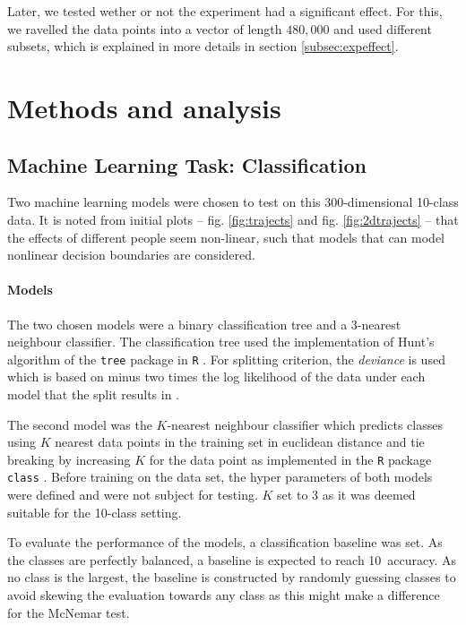 \documentclass[11pt,fleqn]{article}
\begin{document}
Later, we tested wether or not the experiment had a significant effect.
For this, we ravelled the data points into a vector of length $ 480,000 $ and used different subsets, which is explained in more details in section \ref{subsec:expeffect}.


\section{Methods and analysis}


\subsection{Machine Learning Task: Classification}
Two machine learning models were chosen to test on this 300-dimensional 10-class data.
It is noted from initial plots -- fig. \ref{fig:trajects} and fig. \ref{fig:2dtrajects} -- that the effects of different people seem non-linear, such that models that can model nonlinear decision boundaries are considered.


\paragraph{Models} The two chosen models were a binary classification tree and a 3-nearest neighbour classifier. The classification tree used the implementation of Hunt's algorithm of the \texttt{tree} package in \texttt{R} \cite{Tree}. For splitting criterion, the \textit{deviance} is used which is based on minus two times the log likelihood of the data under each model that the split results in \cite{Deviance}.

The second model was the \(K\)-nearest neighbour classifier which predicts classes using \(K\) nearest data points in the training set in euclidean distance and tie breaking by increasing \(K\) for the data point as implemented in the \texttt{R} package \texttt{class} \cite{KNN}. Before training on the data set, the hyper parameters of both models were defined and were not subject for testing. \(K\) set to 3 as it was deemed suitable for the 10-class setting.

To evaluate the performance of the models, a classification baseline was set. As the classes are perfectly balanced, a baseline is expected to reach 10\pro\ accuracy. As no class is the largest, the baseline is constructed by randomly guessing classes to avoid skewing the evaluation towards any class as this might make a difference for the McNemar test.
\end{document}
